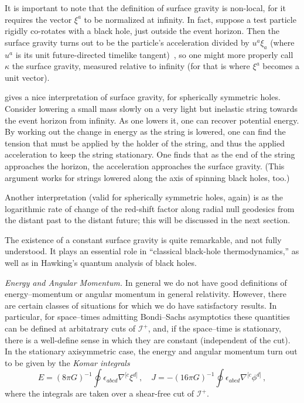 \documentclass[12pt]{article}
\newcommand{\scrif}{{{\mathscr I}^{+}}}
\begin{document}
It is important to note that the definition of surface gravity is non-local, for it requires the vector $\xi ^a$ to be normalized at infinity.  In fact, suppose a test particle rigidly co-rotates with a black hole, just outside the event horizon.  Then the surface gravity turns out to be the particle's acceleration divided by $u^a\xi _a$ (where $u^a$ is its unit future-directed timelike tangent)~\citep{Bardeen:1973gs}, so one might more properly call $\kappa$ the surface gravity, measured relative to infinity (for that is where $\xi ^a$ becomes a unit vector).

\citet{Wald:1984} gives a nice interpretation of surface gravity, for spherically symmetric holes.  Consider lowering a small mass slowly on a very light but inelastic string towards the event horizon from infinity.  As one lowers it, one can recover potential energy.  By working out the change in energy as the string is lowered, one can find the tension that must be applied by the holder of the string, and thus the applied acceleration to keep the string stationary.  One finds that as the end of the string approaches the horizon, the acceleration approaches the surface gravity.  (This argument works for strings lowered along the axis of spinning black holes, too.)

Another interpretation (valid for spherically symmetric holes, again) is as the logarithmic rate of change of the red-shift factor along radial null geodesics from the distant past to the distant future; this will be discussed in the next section.

The existence of a constant surface gravity is quite remarkable, and not fully understood.  It plays an essential role in ``classical black-hole thermodynamics,'' as well as in Hawking's quantum analysis of black holes.

{\em Energy and Angular Momentum.}
In general we do not have good definitions of energy--momentum or angular momentum in general relativity.  However, there are certain classes of situations for which we do have satisfactory results.  In particular, for space--times admitting Bondi--Sachs asymptotics these quantities can be defined at arbitatrary cuts of $\scrif$, and, if the space--time is stationary, there is a well-define sense in which they are constant (independent of the cut).  In the stationary axisymmetric case, the energy and angular momentum turn out to be given by the {\em Komar integrals}
\begin{equation}
  E=(8\pi G)^{-1}\oint \epsilon _{abcd}\nabla ^{[c}\xi ^{d]}
  \, ,\quad
  J=-(16\pi G)^{-1}\oint \epsilon _{abcd}\nabla ^{[c}\phi ^{d]}\, ,
\end{equation}
where the integrals are taken over a shear-free cut of $\scrif$.
\end{document}
